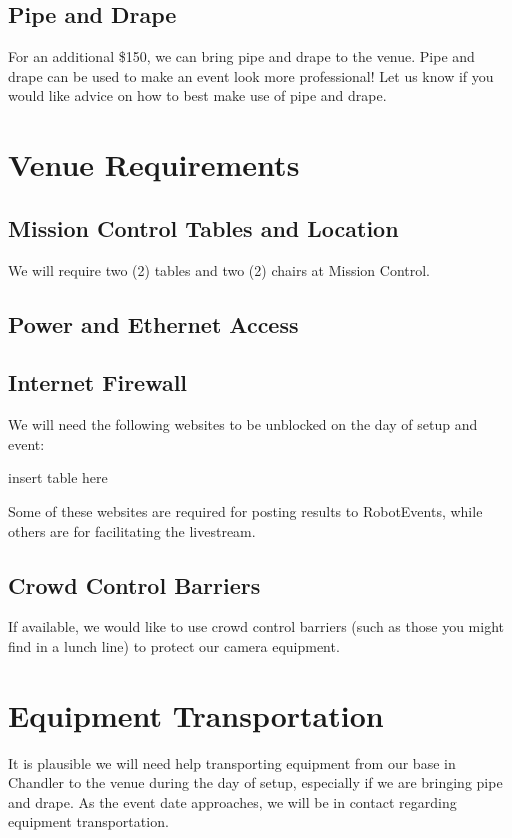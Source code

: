 \documentclass[12pt]{article}
\begin{document}
\subsection{Pipe and Drape}
For an additional \$150, we can bring pipe and drape to the venue.
Pipe and drape can be used to make an event look more professional!
Let us know if you would like advice on how to best make use of pipe and drape.

\section{Venue Requirements}
\subsection{Mission Control Tables and Location}
We will require two (2) tables and two (2) chairs at Mission Control.
\subsection{Power and Ethernet Access}
\subsection{Internet Firewall}
We will need the following websites to be unblocked on the day of setup and event:

insert table here

\noindent Some of these websites are required for posting results to RobotEvents, while others are for facilitating the livestream.

\subsection{Crowd Control Barriers}
If available, we would like to use crowd control barriers (such as those you might find in a lunch line) to protect our camera equipment.

\section{Equipment Transportation}
It is plausible we will need help transporting equipment from our base in Chandler to the venue during the day of setup, especially if we are bringing pipe and drape.
As the event date approaches, we will be in contact regarding equipment transportation.
\end{document}
